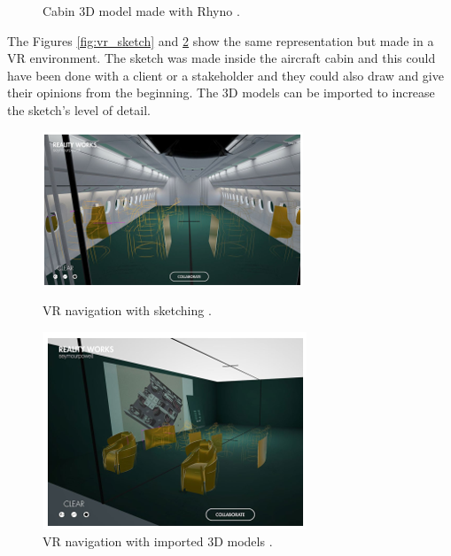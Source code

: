 \begin{figure}[h]
\begin{minipage}{.45\textwidth}
    \caption{Cabin 3D model made with Rhyno \cite{moerland2021application}.}
    \label{fig:cabin_3d_model}
\end{minipage}
\end{figure}

The Figures \ref{fig:vr_sketch} and \ref{fig:vr_3d_model} show the same representation but made in a VR environment. The sketch was made inside the aircraft cabin and this could have been done with a client or a stakeholder and they could also draw and give their opinions from the beginning. The 3D models can be imported to increase the sketch's level of detail.

\begin{figure}[h]
\centering
\begin{minipage}{.45\textwidth}
    \centering
    \includegraphics[width = \linewidth]{Revisao/VR Cabin/VR sketch.png}
    \caption{VR navigation with sketching \cite{moerland2021application}.}
    \label{fig:vr_sketch}
\end{minipage}
\hfil
\begin{minipage}{.45\textwidth}
    \centering
    \includegraphics[width = \linewidth]{Revisao/VR Cabin/VR 3D Model.png}
    \caption{VR navigation with imported 3D models \cite{moerland2021application}.}
    \label{fig:vr_3d_model}
\end{minipage}
\end{figure}

